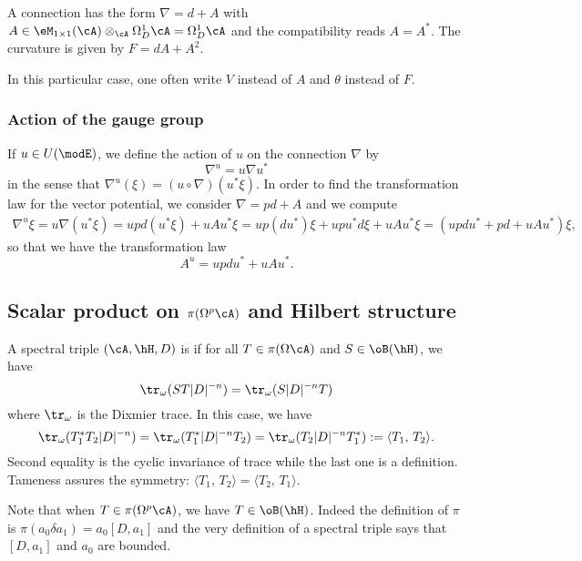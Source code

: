 A connection has the form $\nabla=d+A$ with $A\in\eM_{1\times 1}(\cA)\otimes_{\cA}\Omega^1_D\cA=\Omega^1_D\cA$ and the compatibility reads $A=A^*$. The curvature is given by $F=dA+A^2$.

In this particular case, one often write $V$ instead of $A$ and $\theta$ instead of $F$.

\subsubsection{Action of the gauge group}	\label{PgSimplestwordl}

If $u\in U(\modE)$, we define the action of $u$ on the connection $\nabla$ by 
\begin{equation}
\nabla^u=u\nabla u^*
\end{equation}
in the sense that $\nabla^u(\xi)=(u\circ\nabla)(u^*\xi)$. In order to find the transformation law for the vector potential, we consider $\nabla=pd+A$ and we compute
\[ 
\begin{split}
\nabla^u\xi	=u\nabla(u^*\xi)
		=upd(u^*\xi)+uAu^*\xi
		=up(du^*)\xi+upu^*d\xi+uAu^*\xi
		=(updu^*+pd+uAu^*)\xi,
\end{split}  
\]
so that we have the transformation law
\begin{equation}		\label{EqTransAjauge}
A^u=updu^*+uAu^*.
\end{equation}

\subsection{Scalar product on \texorpdfstring{$\pi(\Omega^p\cA)$}{piOpA} and Hilbert structure}

A spectral triple $(\cA,\hH,D)$ is  if for all $T\in\pi(\Omega\cA)$ and $S\in\oB(\hH)$, we have
\[ 
 \tr_{\omega}(ST|D|^{-n})=\tr_{\omega}(S|D|^{-n} T) 
\]
where $\tr_{\omega}$ is the Dixmier trace. In this case, we have
\begin{equation}
\tr_{\omega}(T_1^*T_2|D|^{-n})=\tr_{\omega}(T_1^*|D|^{-n}T_2)=\tr_{\omega}(T_2|D|^{-n}T_1^*):=\langle T_1,\,T_2\rangle.
\end{equation}
Second equality is the cyclic invariance of trace while the last one is a definition. Tameness assures the symmetry: $\langle T_1,\,T_2\rangle=\langle T_2,\,T_1\rangle$. 

Note that when $T\in\pi(\Omega^p\cA)$, we have $T\in\oB(\hH)$. Indeed the definition of $\pi$ is $\pi(a_0\delta a_1)=a_0[D,a_1]$ and the very definition of a spectral triple says that $[D,a_1]$ and $a_0$ are bounded.

